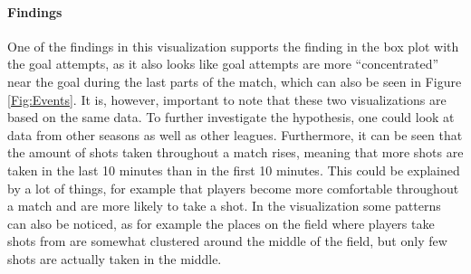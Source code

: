 \documentclass[Report.tex]{subfiles}
\begin{document}
\paragraph{Findings\\}
One of the findings in this visualization supports the finding in the box plot with the goal attempts, as it also looks like goal attempts are more ``concentrated'' near the goal during the last parts of the match, which can also be seen in Figure \ref{Fig:Events}. It is, however, important to note that these two visualizations are based on the same data. To further investigate the hypothesis, one could look at data from other seasons as well as other leagues. Furthermore, it can be seen that the amount of shots taken throughout a match rises, meaning that more shots are taken in the last 10 minutes than in the first 10 minutes. This could be explained by a lot of things, for example that players become more comfortable throughout a match and are more likely to take a shot. In the visualization some patterns can also be noticed, as for example the places on the field where players take shots from are somewhat clustered around the middle of the field, but only few shots are actually taken in the middle.
\end{document}
